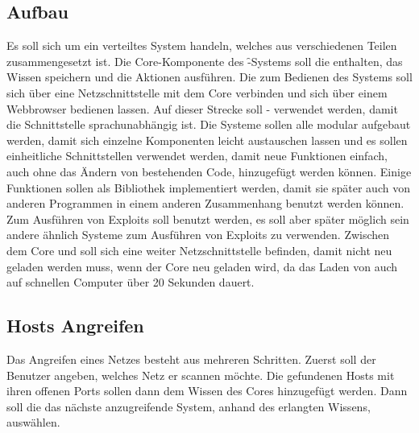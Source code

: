 \subsection{Aufbau}
\label{chp:objectives-archi}
Es soll sich um ein verteiltes System handeln, welches aus verschiedenen Teilen
zusammengesetzt ist.
Die Core-Komponente des \f-Systems soll die  enthalten, das Wissen
speichern und die Aktionen ausführen.
Die  zum Bedienen des Systems soll sich über eine Netzschnittstelle mit dem 
Core verbinden und sich über einem Webbrowser bedienen lassen.
Auf dieser Strecke soll - verwendet werden, damit die Schnittstelle
sprachunabhängig ist.
Die Systeme sollen alle modular aufgebaut werden, damit sich einzelne
Komponenten leicht austauschen lassen und es sollen einheitliche Schnittstellen
verwendet werden, damit neue Funktionen einfach, auch ohne das Ändern von
bestehenden Code, hinzugefügt werden können.
Einige Funktionen sollen als Bibliothek implementiert werden, damit sie später
auch von anderen Programmen in einem anderen Zusammenhang benutzt werden können.
Zum Ausführen von Exploits soll  benutzt werden, es soll aber später
möglich sein andere ähnlich Systeme zum Ausführen von Exploits zu verwenden.
Zwischen dem Core und  soll sich eine weiter Netzschnittstelle
befinden, damit  nicht neu geladen werden muss, wenn der Core neu
geladen wird, da das Laden von  auch auf schnellen Computer über 20 Sekunden dauert.




\subsection{Hosts Angreifen}
\authors{\HM}{\BK \and \JF \and \DE \and \LM \and \MW}
\label{chp:objectives-functions-pwnen}

Das Angreifen eines Netzes besteht aus mehreren Schritten. 
Zuerst soll der Benutzer angeben, welches Netz er scannen möchte. Die gefundenen
Hosts mit ihren offenen Ports sollen dann dem Wissen des Cores hinzugefügt werden.
Dann soll die  das nächste anzugreifende System, anhand 
des erlangten Wissens, auswählen.


